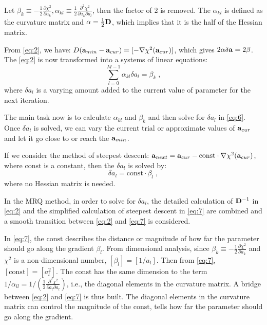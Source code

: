 Let $\beta_k\equiv-\frac{1}{2}\frac{\partial\chi^2}{\partial a_k}, \alpha_{kl}\equiv \frac{1}{2}\frac{\partial^2\chi^2}{\partial a_k\partial a_l}$, then the factor of 2 is removed. The $\alpha_{kl}$ is defined as the curvature matrix and ${\bf \alpha}=\frac{1}{2}{\bf D}$, which implies that it is the half of the Hessian matrix.

From \ref{eq:2}, we have: $D({\bf a}_{min}-{\bf a}_{cur}) = [-\nabla\chi^2({\bf a}_{cur})]$, which gives $2{\bf\alpha\delta a}= 2{\bf\beta}$. The \ref{eq:2} is now transformed into a systems of linear equations:
\begin{equation}\label{eq:6}
\sum_{l=0}^{M-1}\alpha_{kl}\delta a_l = \beta_k \; ,
\end{equation} where $\delta a_l$ is 
a varying amount added to the current value of parameter for the next iteration. 

The main task now is to calculate $\alpha_{kl}$ and $\beta_k$ and then solve for $\delta a_l$ in \ref{eq:6}. Once $\delta a_l$ is solved, we can vary the current trial or approximate values of ${\bf a}_{cur}$ and let it go close to or reach the ${\bf a}_{min}$.

If we consider the method of steepest descent: ${\bf a}_{next}={\bf a}_{cur}-\mathrm{const}\cdot\nabla\chi^2({\bf a}_{cur})$, where $\mathrm{const}$ is a constant, then the $\delta a_l$ is solved by: 
\begin{equation}\label{eq:7}
\delta a_l=\mathrm{const}\cdot \beta_l \; , 
\end{equation}
where no Hessian matrix is needed.

In the MRQ method, in order to solve for $\delta a_l$, the detailed calculation of ${\bf D}^{-1}$ in \ref{eq:2} and the simplified calculation of steepest descent in \ref{eq:7} are combined and a smooth transition between \ref{eq:2} and \ref{eq:7} is considered.

In \ref{eq:7}, the $\mathrm{const}$ describes the distance or magnitude of how far the parameter should go along the gradient $\beta_l$. From dimensional analysis, since $\beta_k\equiv-\frac{1}{2}\frac{\partial\chi^2}{\partial a_k}$ and $\chi^2$ is a non-dimensional number, $[\beta_l]=[1/a_l]$. Then from \ref{eq:7}, $[\mathrm{const}]=[a^2_l]$. The $\mathrm{const}$ has the same dimension to the term $1/\alpha_{ll}= 1/(\frac{1}{2}\frac{\partial^2\chi^2}{\partial a_l\partial a_l})$, i.e., the diagonal elements in the curvature matrix. A bridge between \ref{eq:2} and \ref{eq:7} is thus built. The diagonal elements in the curvature matrix can control the magnitude of the $\mathrm{const}$, tells how far the parameter should go along the gradient. 

